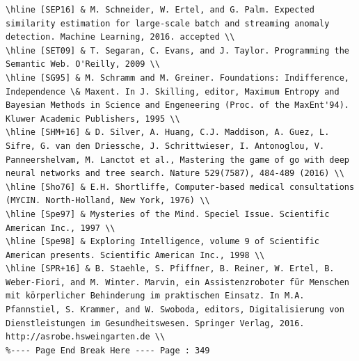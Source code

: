 \documentclass[10pt]{book}
\begin{document}
\begin{center}
\begin{enumerate}
\begin{center}
\begin{center}
\begin{center}
\begin{center}
\begin{center}
\begin{verbatim}
\hline [SEP16] & M. Schneider, W. Ertel, and G. Palm. Expected similarity estimation for large-scale batch and streaming anomaly detection. Machine Learning, 2016. accepted \\
\hline [SET09] & T. Segaran, C. Evans, and J. Taylor. Programming the Semantic Web. O'Reilly, 2009 \\
\hline [SG95] & M. Schramm and M. Greiner. Foundations: Indifference, Independence \& Maxent. In J. Skilling, editor, Maximum Entropy and Bayesian Methods in Science and Engeneering (Proc. of the MaxEnt'94). Kluwer Academic Publishers, 1995 \\
\hline [SHM+16] & D. Silver, A. Huang, C.J. Maddison, A. Guez, L. Sifre, G. van den Driessche, J. Schrittwieser, I. Antonoglou, V. Panneershelvam, M. Lanctot et al., Mastering the game of go with deep neural networks and tree search. Nature 529(7587), 484-489 (2016) \\
\hline [Sho76] & E.H. Shortliffe, Computer-based medical consultations (MYCIN. North-Holland, New York, 1976) \\
\hline [Spe97] & Mysteries of the Mind. Speciel Issue. Scientific American Inc., 1997 \\
\hline [Spe98] & Exploring Intelligence, volume 9 of Scientific American presents. Scientific American Inc., 1998 \\
\hline [SPR+16] & B. Staehle, S. Pfiffner, B. Reiner, W. Ertel, B. Weber-Fiori, and M. Winter. Marvin, ein Assistenzroboter für Menschen mit körperlicher Behinderung im praktischen Einsatz. In M.A. Pfannstiel, S. Krammer, and W. Swoboda, editors, Digitalisierung von Dienstleistungen im Gesundheitswesen. Springer Verlag, 2016. http://asrobe.hsweingarten.de \\
%---- Page End Break Here ---- Page : 349


\end{verbatim}
\end{center}
\end{center}
\end{center}
\end{center}
\end{center}
\end{enumerate}
\end{center}
\end{document}
